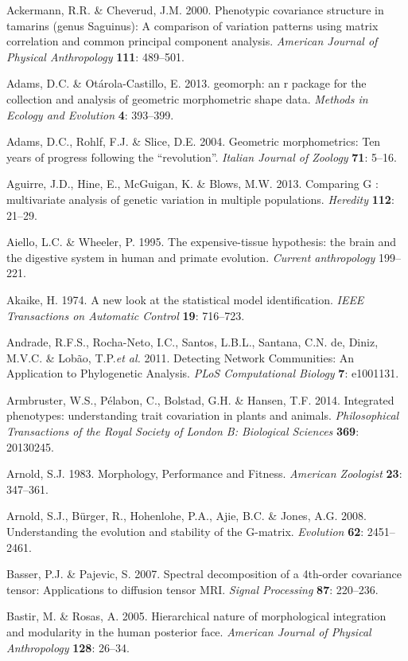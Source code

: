 \documentclass[12pt,twoside]{report}
\begin{document}
Ackermann, R.R. \& Cheverud, J.M. 2000. Phenotypic covariance structure
in tamarins (genus Saguinus): A comparison of variation patterns using
matrix correlation and common principal component analysis.
\emph{American Journal of Physical Anthropology} \textbf{111}: 489--501.

Adams, D.C. \& Otárola-Castillo, E. 2013. geomorph: an r package for the
collection and analysis of geometric morphometric shape data.
\emph{Methods in Ecology and Evolution} \textbf{4}: 393--399.

Adams, D.C., Rohlf, F.J. \& Slice, D.E. 2004. Geometric morphometrics:
Ten years of progress following the ``revolution''. \emph{Italian
Journal of Zoology} \textbf{71}: 5--16.

Aguirre, J.D., Hine, E., McGuigan, K. \& Blows, M.W. 2013. Comparing G :
multivariate analysis of genetic variation in multiple populations.
\emph{Heredity} \textbf{112}: 21--29.

Aiello, L.C. \& Wheeler, P. 1995. The expensive-tissue hypothesis: the
brain and the digestive system in human and primate evolution.
\emph{Current anthropology} 199--221.

Akaike, H. 1974. A new look at the statistical model identification.
\emph{IEEE Transactions on Automatic Control} \textbf{19}: 716--723.

Andrade, R.F.S., Rocha-Neto, I.C., Santos, L.B.L., Santana, C.N. de,
Diniz, M.V.C. \& Lobão, T.P.\emph{et al.} 2011. Detecting Network
Communities: An Application to Phylogenetic Analysis. \emph{PLoS
Computational Biology} \textbf{7}: e1001131.

Armbruster, W.S., Pélabon, C., Bolstad, G.H. \& Hansen, T.F. 2014.
Integrated phenotypes: understanding trait covariation in plants and
animals. \emph{Philosophical Transactions of the Royal Society of London
B: Biological Sciences} \textbf{369}: 20130245.

Arnold, S.J. 1983. Morphology, Performance and Fitness. \emph{American
Zoologist} \textbf{23}: 347--361.

Arnold, S.J., Bürger, R., Hohenlohe, P.A., Ajie, B.C. \& Jones, A.G.
2008. Understanding the evolution and stability of the G-matrix.
\emph{Evolution} \textbf{62}: 2451--2461.

Basser, P.J. \& Pajevic, S. 2007. Spectral decomposition of a 4th-order
covariance tensor: Applications to diffusion tensor MRI. \emph{Signal
Processing} \textbf{87}: 220--236.

Bastir, M. \& Rosas, A. 2005. Hierarchical nature of morphological
integration and modularity in the human posterior face. \emph{American
Journal of Physical Anthropology} \textbf{128}: 26--34.
\end{document}
